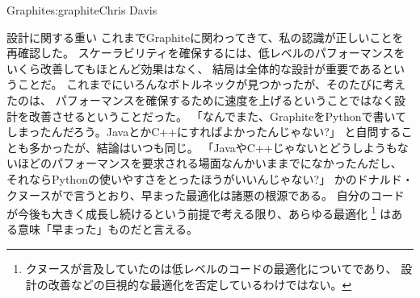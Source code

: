 \begin{aosachapter}{Graphite}{s:graphite}{Chris Davis}
\begin{aosasect1}{設計に関する重い}
これまでGraphiteに関わってきて、私の認識が正しいことを再確認した。
スケーラビリティを確保するには、低レベルのパフォーマンスをいくら改善してもほとんど効果はなく、
結局は全体的な設計が重要であるということだ。
これまでにいろんなボトルネックが見つかったが、そのたびに考えたのは、
パフォーマンスを確保するために速度を上げるということではなく設計を改善させるということだった。
「なんでまた、GraphiteをPythonで書いてしまったんだろう。JavaとかC++にすればよかったんじゃない?」
と自問することも多かったが、結論はいつも同じ。
「JavaやC++じゃないとどうしようもないほどのパフォーマンスを要求される場面なんかいままでになかったんだし、
それならPythonの使いやすさをとったほうがいいんじゃない?」
かのドナルド・クヌースが\cite{bib:knuth:goto}で言うとおり、早まった最適化は諸悪の根源である。
自分のコードが今後も大きく成長し続けるという前提で考える限り、あらゆる最適化
\footnote{クヌースが言及していたのは低レベルのコードの最適化についてであり、
設計の改善などの巨視的な最適化を否定しているわけではない。}
はある意味「早まった」ものだと言える。


\end{aosasect1}
\end{aosachapter}
